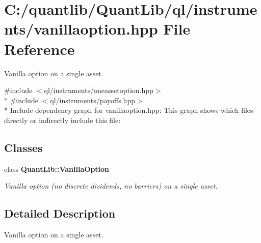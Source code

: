 \section{C\+:/quantlib/\+Quant\+Lib/ql/instruments/vanillaoption.hpp File Reference}
\label{vanillaoption_8hpp}


Vanilla option on a single asset.  


{\ttfamily \#include $<$ql/instruments/oneassetoption.\+hpp$>$}\\*
{\ttfamily \#include $<$ql/instruments/payoffs.\+hpp$>$}\\*
Include dependency graph for vanillaoption.\+hpp\+:
This graph shows which files directly or indirectly include this file\+:
\subsection*{Classes}
\begin{DoxyCompactItemize}
\item 
class {\bf Quant\+Lib\+::\+Vanilla\+Option}
\begin{DoxyCompactList}\small\item\em Vanilla option (no discrete dividends, no barriers) on a single asset. \end{DoxyCompactList}\end{DoxyCompactItemize}


\subsection{Detailed Description}
Vanilla option on a single asset. 

